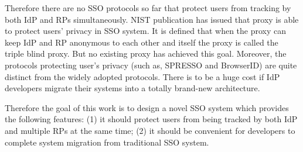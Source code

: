 Therefore there are no SSO protocols so far that protect users from tracking by both IdP and RPs simultaneously. NIST publication has issued that proxy is able to protect users' privacy in SSO system. It is defined that when the proxy can keep IdP and RP anonymous to each other and itself the proxy is called the triple blind proxy. But no existing proxy has achieved this goal. 
Moreover, the protocols protecting user's privacy (such as, SPRESSO and BrowserID) are quite distinct from the widely adopted protocols. There is to be a huge cost if IdP developers migrate their systems into a totally brand-new architecture.

 




Therefore the goal of this work is to design a novel SSO system which provides the following features: 
(1) it should protect users from being tracked by both IdP and multiple RPs at the same time; 
(2) it should be convenient for developers to complete system migration from traditional SSO system.

